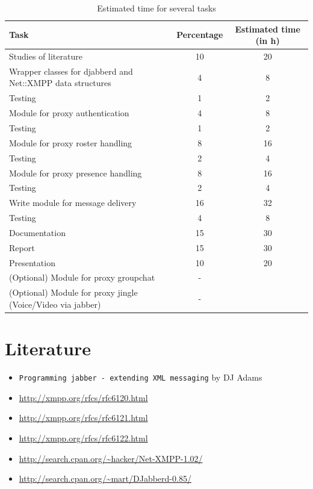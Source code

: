 \documentclass[a4paper,10pt,numbers=noendperiod]{scrartcl}
\begin{document}
\begin{table}[h]
	\centering
	\begin{tabular}{|l|c|c|}
	\hline
	\textbf{Task} & \textbf{Percentage} & \textbf{Estimated time (in h)} \\
	\hline
	\hline
	Studies of literature & 10 & 20 \\
	\hline
	Wrapper classes for djabberd and Net::XMPP data structures & 4 & 8 \\
	Testing & 1 & 2\\
	\hline
	Module for proxy authentication & 4 & 8 \\
	Testing & 1 & 2 \\
	\hline
	Module for proxy roster handling & 8 & 16 \\ 
	Testing & 2 & 4 \\ 
	\hline
	Module for proxy presence handling & 8 & 16 \\ 
	Testing & 2 & 4 \\ 
	\hline
	Write module for message delivery & 16 & 32 \\
	Testing & 4 & 8\\
	\hline
	Documentation & 15 & 30\\
	\hline
        Report & 15 & 30\\
	\hline
	Presentation & 10 & 20\\
	\hline
	(Optional) Module for proxy groupchat & - & \\
	\hline
	(Optional) Module for proxy jingle (Voice/Video via jabber) & - & \\
	\hline
	\end{tabular}
	\caption{Estimated time for several tasks}
	\label{tab:estimatedtime}
\end{table}


\section{Literature}
\begin{itemize}
	\item \texttt{Programming jabber - extending XML messaging} by DJ Adams\\
	\item \url{http://xmpp.org/rfcs/rfc6120.html}\\
	\item \url{http://xmpp.org/rfcs/rfc6121.html}\\
	\item \url{http://xmpp.org/rfcs/rfc6122.html}\\
	\item \url{http://search.cpan.org/~hacker/Net-XMPP-1.02/}\\
	\item \url{http://search.cpan.org/~mart/DJabberd-0.85/}\\
\end{itemize}
\end{document}
